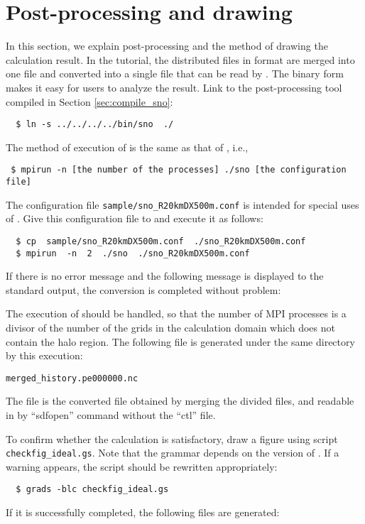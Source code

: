 \section{Post-processing and drawing} \label{sec:ideal_exp_sno}
In this section, we explain post-processing and the method of drawing the calculation result.
In the tutorial, the distributed files in \netcdf format are merged into one file
and converted into a single \netcdf file that can be read by {\grads}.
The binary form makes it easy for users to analyze the result.
Link to the post-processing tool \sno compiled in Section \ref{sec:compile_sno}:
\begin{verbatim}
  $ ln -s ../../../../bin/sno  ./
\end{verbatim}

The method of execution of \sno is the same as that of \scalerm, i.e.,
\begin{verbatim}
 $ mpirun -n [the number of the processes] ./sno [the configuration file]
\end{verbatim}
The configuration file \verb|sample/sno_R20kmDX500m.conf| is intended for special uses of \sno.
Give this configuration file to \sno and execute it as follows:
\begin{verbatim}
  $ cp  sample/sno_R20kmDX500m.conf  ./sno_R20kmDX500m.conf
  $ mpirun  -n  2  ./sno  ./sno_R20kmDX500m.conf
\end{verbatim}
If there is no error message and the following message is displayed to the standard output,
the conversion is completed without problem:

The execution of \sno should be handled, 
so that the number of MPI processes is a divisor of the number of the grids in the calculation domain which does not contain the halo region.
The following file is generated under the same directory by this execution:
\begin{alltt}
  merged_history.pe000000.nc
\end{alltt}
The \netcdf file is the converted file obtained by merging the divided files,
and readable in \grads by ``sdfopen'' command without the ``ctl'' file.

To confirm whether the calculation is satisfactory,
draw a figure using \grads script \verb|checkfig_ideal.gs|.
Note that the grammar depends on the version of \grads.
If a warning appears, the \grads script should be rewritten appropriately:
\begin{verbatim}
  $ grads -blc checkfig_ideal.gs
\end{verbatim}
If it is successfully completed, the following files are generated:

